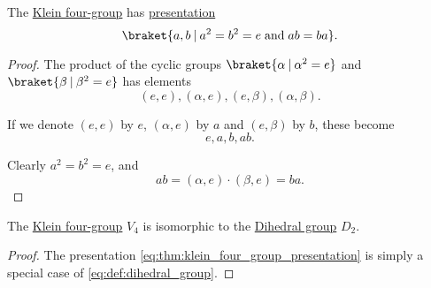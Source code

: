 \begin{proposition}\label{thm:klein_four_group_presentation}
  The \hyperref[def:klein_four_group]{Klein four-group} has \hyperref[def:group_presentation]{presentation}
  \begin{equation}\label{eq:thm:klein_four_group_presentation}
    \braket{ a, b \given a^2 = b^2 = e \T{and} ab = ba }.
  \end{equation}
\end{proposition}
\begin{proof}
  The product of the cyclic groups \( \braket{ \alpha \given \alpha^2 = e } \) and \( \braket{ \beta \given \beta^2 = e } \) has elements
  \begin{equation*}
    (e, e), (\alpha, e), (e, \beta), (\alpha, \beta).
  \end{equation*}

  If we denote \( (e, e) \) by \( e \), \( (\alpha, e) \) by \( a \) and \( (e, \beta) \) by \( b \), these become
  \begin{equation*}
    e, a, b, ab.
  \end{equation*}

  Clearly \( a^2 = b^2 = e \), and
  \begin{equation*}
    ab = (\alpha, e) \cdot (\beta, e) = ba.
  \end{equation*}
\end{proof}

\begin{corollary}\label{thm:klein_four_group_dihedral}
  The \hyperref[def:klein_four_group]{Klein four-group} \( V_4 \) is isomorphic to the \hyperref[def:dihedral_group]{Dihedral group} \( D_2 \).
\end{corollary}
\begin{proof}
  The presentation \eqref{eq:thm:klein_four_group_presentation} is simply a special case of \eqref{eq:def:dihedral_group}.
\end{proof}

